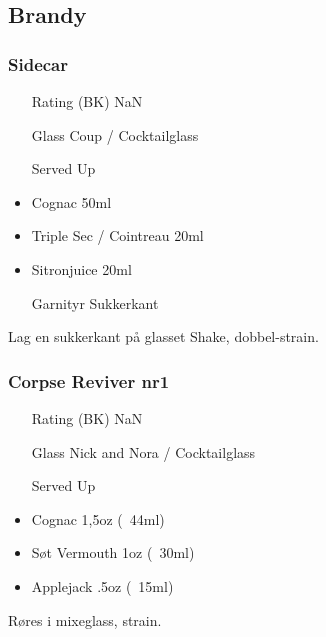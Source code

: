 \subsection{Brandy}

\subsubsection{Sidecar}
\begin{itemize}
    \item[Rating (BK)] NaN
    \item[Glass] Coup / Cocktailglass
    \item[Served] Up
    \item Cognac 50ml
    \item Triple Sec / Cointreau 20ml
    \item Sitronjuice 20ml
    \item[Garnityr] Sukkerkant
\end{itemize}
Lag en sukkerkant på glasset
Shake, dobbel-strain.

\subsubsection{Corpse Reviver nr1}
\begin{itemize}
    \item[Rating (BK)] NaN
    \item[Glass] Nick and Nora / Cocktailglass
    \item[Served] Up
    \item Cognac 1,5oz (~44ml)
    \item Søt Vermouth 1oz (~30ml)
    \item Applejack .5oz (~15ml)
\end{itemize}

Røres i mixeglass, strain.
